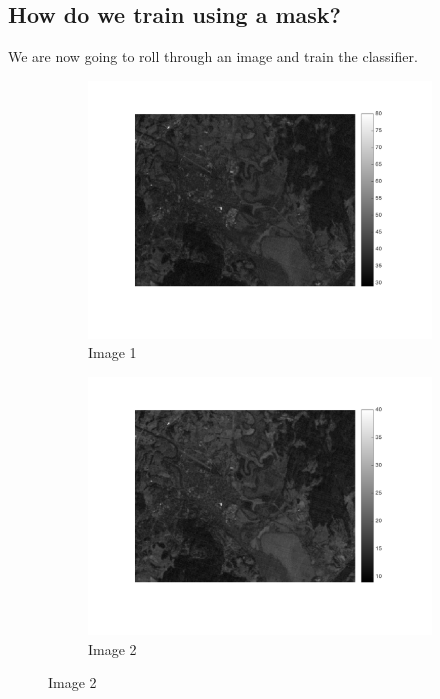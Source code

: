 \documentclass[12pt,a4paper]{report}
\begin{document}
\subsection{How do we train using a mask?}
We are now going to roll through an image and train the classifier.
\begin{figure}[!ht]
	\begin{subfigure}{0.5\textwidth}
	\centering
	\includegraphics[width=1.0\textwidth]{Landsat1}	
	\caption*{Image 1}
	\end{subfigure}
	\begin{subfigure}{0.5\textwidth}
	\centering
	\includegraphics[width=1.0\textwidth]{Landsat2}
	\caption*{Image 2}
	\end{subfigure}
\end{figure}
\end{document}

